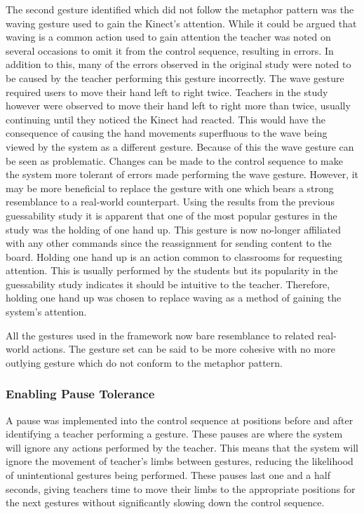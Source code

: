 \documentclass[link]{IWCOMP}
\begin{document}
The second gesture identified which did not follow the metaphor pattern was the waving gesture used to gain the Kinect's attention.
While it could be argued that waving is a common action used to gain attention the teacher was noted on several occasions to omit it from the control sequence, resulting in errors.
In addition to this, many of the errors observed in the original study were noted to be caused by the teacher performing this gesture incorrectly.
The wave gesture required users to move their hand left to right twice.
Teachers in the study however were observed to move their hand left to right more than twice, usually continuing until they noticed the Kinect had reacted.
This would have the consequence of causing the hand movements superfluous to the wave being viewed by the system as a different gesture.
Because of this the wave gesture can be seen as problematic.
Changes can be made to the control sequence to make the system more tolerant of errors made performing the wave gesture.
However, it may be more beneficial to replace the gesture with one which bears a strong resemblance to a real-world counterpart.
Using the results from the previous guessability study it is apparent that one of the most popular gestures in the study was the holding of one hand up.
This gesture is now no-longer affiliated with any other commands since the reassignment for sending content to the board.
Holding one hand up is an action common to classrooms for requesting attention.
This is usually performed by the students but its popularity in the guessability study indicates it should be intuitive to the teacher.
Therefore, holding one hand up was chosen to replace waving as a method of gaining the system's attention.

All the gestures used in the framework now bare resemblance to related real-world actions.
The gesture set can be said to be more cohesive with no more outlying gesture which do not conform to the metaphor pattern.

\subsubsection{Enabling Pause Tolerance}  
\label{subsubsec:studyImplementationPauseTolerance}

A pause was implemented into the control sequence at positions before and after identifying a teacher performing a gesture.
These pauses are where the system will ignore any actions performed by the teacher.
This means that the system will ignore the movement of teacher's limbs between gestures, reducing the likelihood of unintentional gestures being performed.
These pauses last one and a half seconds, giving teachers time to move their limbs to the appropriate positions for the next gestures without significantly slowing down the control sequence.
\end{document}
